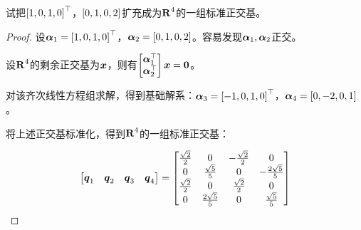 \begin{problem}
试把\(\left[ 1,0,1,0 \right]^\top\)，\(\left[ 0,1,0,2 \right]\)扩充成为\(\boldsymbol{\mathrm{R}}^4\)的一组标准正交基。
\end{problem}
\begin{proof}
    设\(\boldsymbol{\alpha}_1=\left[ 1,0,1,0 \right]^\top\)，\(\boldsymbol{\alpha}_2=\left[ 0,1,0,2 \right]\)。容易发现\(\boldsymbol{\alpha}_1,\boldsymbol{\alpha}_2\)正交。

    设\(\boldsymbol{\mathrm{R}}^4\)的剩余正交基为\(\boldsymbol{x}\)，则有\(\begin{bmatrix}\boldsymbol{\alpha}_1^\top\\\boldsymbol{\alpha}_2^\top\end{bmatrix}\boldsymbol{x}=\boldsymbol{0}\)。

    对该齐次线性方程组求解，得到基础解系：\(\boldsymbol{\alpha}_3=\left[ -1,0,1,0 \right]^\top\)，\(\boldsymbol{\alpha}_4=\left[ 0,-2,0,1 \right]\)。

    将上述正交基标准化，得到\(\boldsymbol{\mathrm{R}}^4\)的一组标准正交基：

    \begin{equation*}
        \begin{bmatrix}
            \boldsymbol{q}_1 & \boldsymbol{q}_2 & \boldsymbol{q}_3 & \boldsymbol{q}_4
        \end{bmatrix}=
        \begin{bmatrix}
            \frac{\sqrt{2}}{2} & 0                   & -\frac{\sqrt{2}}{2} & 0                    \\
            0                  & \frac{\sqrt{5}}{5}  & 0                   & -\frac{2\sqrt{5}}{5} \\
            \frac{\sqrt{2}}{2} & 0                   & \frac{\sqrt{2}}{2}  & 0                    \\
            0                  & \frac{2\sqrt{5}}{5} & 0                   & \frac{\sqrt{5}}{5}
        \end{bmatrix}
    \end{equation*}
\end{proof}

